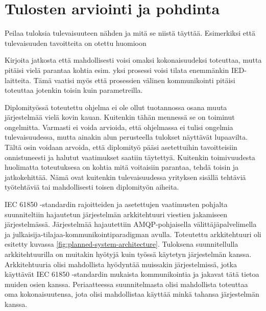 \chapter{Tulosten arviointi ja pohdinta}
\begin{it}
Peilaa tuloksia tulevaisuuteen nähden ja mitä se niistä täyttää. Esimerkiksi että tulevaisuuden tavoitteita on otettu huomioon

Kirjoita jatkosta että mahdollisesti voisi omaksi kokonaisuudeksi toteuttaa, mutta pitäisi vielä parantaa kohtia esim. yksi prosessi voisi tilata enemmänkin IED-laitteita. Tämä vaatisi myös että prosessien välinen kommunikointi pitäisi toteuttaa jotenkin toisin kuin parametreilla.
\end{it}

Diplomityössä toteutettu ohjelma ei ole ollut tuotannossa osana muuta järjestelmää vielä kovin kauan. Kuitenkin tähän mennessä se on toiminut ongelmitta. Varmasti ei voida arvioida, että ohjelmassa ei tulisi ongelmia tulevaisuudessa, mutta ainakin alun perusteella tulokset näyttävät lupaavilta. Tältä osin voidaan arvoida, että diplomityö pääsi asetettuihin tavoitteisiin onnistuneesti ja halutut vaatimukset saatiin täytettyä. Kuitenkin toimivuudesta huolimatta toteutuksesa on kohtia mitä voitaisiin parantaa, tehdä toisin ja jatkokehittää. Nämä ovat kuitenkin tulevaisuudessa yrityksen sisällä tehtäviä työtehtäviä tai mahdollisesti toisen diplomityön aiheita.

IEC 61850 -standardin rajoitteiden ja asetettujen vaatimusten pohjalta suunniteltiin hajautetun järjestelmän arkkitehtuuri viestien jakamiseen järjestelmässä. Järjestelmää hajautettiin AMQP-pohjaisella välittäjäpalvelimella ja julkaisija-tilajaa-kommunikointiparadigman avulla. Toteutettu arkkitehtuuri oli esitetty kuvassa \ref{fig:planned-system-architecture}. Tuloksena suunnitellulla arkkitehtuurilla on muitakin hyötyjä kuin työssä käytetyn järjestelmän kanssa. Arkkitehtuuria olisi mahdollista hyödyntää muissakin järjestelmissä, jotka käyttävät IEC 61850 -standardin mukaista kommunikointia ja jakavat tätä tietoa muiden osien kanssa. Periaatteessa suunnitelmasta olisi mahdollista toteuttaa oma kokonaisuutensa, jota olisi mahdollistaa käyttää minkä tahansa järjestelmän kanssa.

